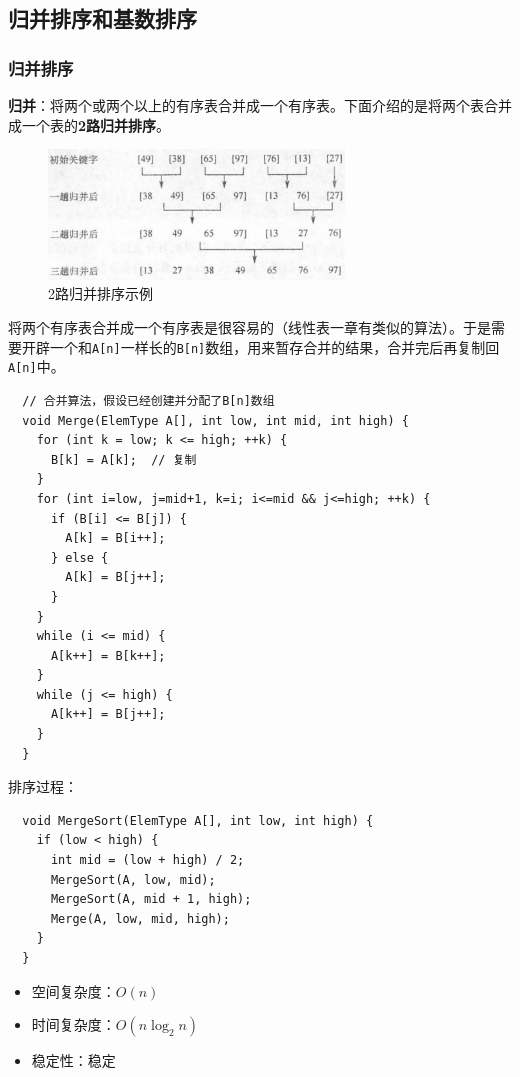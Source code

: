 \documentclass[12pt, a4paper, oneside]{ctexart}
\begin{document}
\subsection{归并排序和基数排序}

\subsubsection{归并排序}

\textbf{归并}：将两个或两个以上的有序表合并成一个有序表。下面介绍的是将两个表合并成一个表的\textbf{2路归并排序}。

\begin{figure}[h]
  \centering
  \includegraphics[width=0.7\textwidth]{./images/2-way-merge-sort.png}
  \caption{2路归并排序示例}
\end{figure}

将两个有序表合并成一个有序表是很容易的（线性表一章有类似的算法）。于是需要开辟一个和\verb|A[n]|一样长的\verb|B[n]|数组，用来暂存合并的结果，合并完后再复制回\verb|A[n]|中。

\begin{lstlisting}
  // 合并算法，假设已经创建并分配了B[n]数组
  void Merge(ElemType A[], int low, int mid, int high) {
    for (int k = low; k <= high; ++k) {
      B[k] = A[k];  // 复制
    }
    for (int i=low, j=mid+1, k=i; i<=mid && j<=high; ++k) {
      if (B[i] <= B[j]) {
        A[k] = B[i++];
      } else {
        A[k] = B[j++];
      }
    }
    while (i <= mid) {
      A[k++] = B[k++];
    }
    while (j <= high) {
      A[k++] = B[j++];
    }
  }
\end{lstlisting}

排序过程：
\begin{lstlisting}
  void MergeSort(ElemType A[], int low, int high) {
    if (low < high) {
      int mid = (low + high) / 2;
      MergeSort(A, low, mid);
      MergeSort(A, mid + 1, high);
      Merge(A, low, mid, high);
    }
  }
\end{lstlisting}

\begin{itemize}
  \item 空间复杂度：$O(n)$
  \item 时间复杂度：$O(n\log_2 n)$
  \item 稳定性：稳定
\end{itemize}
\end{document}
